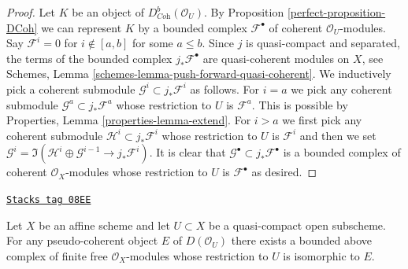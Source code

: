 \begin{proof}

Let $K$ be an object of $D^b_{\textit{Coh}}(\mathcal{O}_U)$.
By Proposition \ref{perfect-proposition-DCoh} we can represent $K$ by a bounded
complex $\mathcal{F}^\bullet$ of coherent $\mathcal{O}_U$-modules.
Say $\mathcal{F}^i = 0$ for $i \not \in [a, b]$ for some $a \leq b$.
Since $j$ is quasi-compact and separated, the terms of the bounded complex
$j_*\mathcal{F}^\bullet$ are quasi-coherent modules on $X$, see
Schemes, Lemma \ref{schemes-lemma-push-forward-quasi-coherent}.
We inductively pick a coherent submodule
$\mathcal{G}^i \subset j_*\mathcal{F}^i$ as follows.
For $i = a$ we pick any coherent submodule
$\mathcal{G}^a \subset j_*\mathcal{F}^a$ whose restriction
to $U$ is $\mathcal{F}^a$. This is possible by
Properties, Lemma \ref{properties-lemma-extend}.
For $i > a$ we first pick any coherent submodule
$\mathcal{H}^i \subset j_*\mathcal{F}^i$
whose restriction to $U$ is $\mathcal{F}^i$
and then we set
$\mathcal{G}^i = \Im(\mathcal{H}^i \oplus \mathcal{G}^{i - 1}
\to j_*\mathcal{F}^i)$. It is clear that
$\mathcal{G}^\bullet \subset j_*\mathcal{F}^\bullet$
is a bounded complex of coherent $\mathcal{O}_X$-modules
whose restriction to $U$ is $\mathcal{F}^\bullet$ as desired.
\end{proof}

\begin{lemma}
\label{perfect-lemma-lift-pseudo-coherent}
\href{https://stacks.math.columbia.edu/tag/08EE}{\texttt{Stacks tag 08EE}}

Let $X$ be an affine scheme and let $U \subset X$ be a quasi-compact
open subscheme. For any pseudo-coherent object $E$ of $D(\mathcal{O}_U)$
there exists a bounded above complex of finite free $\mathcal{O}_X$-modules
whose restriction to $U$ is isomorphic to $E$.
\end{lemma}


